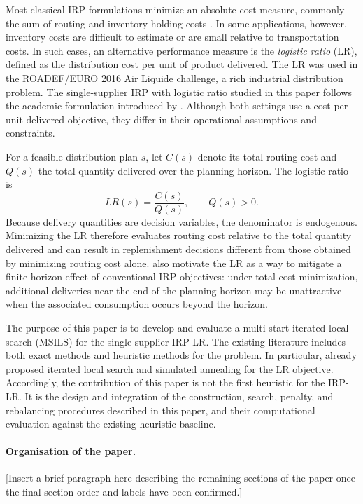 \documentclass{article}
\begin{document}
Most classical IRP formulations minimize an absolute cost measure, commonly
the sum of routing and inventory-holding costs
\citep{archetti2012hybrid,archetti2016inventory}. In some applications,
however, inventory costs are difficult to estimate or are small relative
to transportation costs. In such cases, an alternative performance measure
is the \emph{logistic ratio} (LR), defined as the distribution cost per
unit of product delivered. The LR was used in the ROADEF/EURO 2016
Air Liquide challenge, a rich industrial distribution problem. The
single-supplier IRP with logistic ratio studied in this paper follows the
academic formulation introduced by \cite{archetti2017logistic}. Although
both settings use a cost-per-unit-delivered objective, they differ in
their operational assumptions and constraints.

For a feasible distribution plan $s$, let $C(s)$ denote its total routing
cost and $Q(s)$ the total quantity delivered over the planning horizon.
The logistic ratio is
\begin{equation}
    LR(s)=\frac{C(s)}{Q(s)}, \qquad Q(s)>0.
    \label{eq:general_lr}
\end{equation}
Because delivery quantities are decision variables, the denominator is
endogenous. Minimizing the LR therefore evaluates routing cost relative to
the total quantity delivered and can result in replenishment decisions
different from those obtained by minimizing routing cost alone.
\cite{archetti2017logistic} also motivate the LR as a way to mitigate a
finite-horizon effect of conventional IRP objectives: under total-cost
minimization, additional deliveries near the end of the planning horizon
may be unattractive when the associated consumption occurs beyond the
horizon.

The purpose of this paper is to develop and evaluate a multi-start
iterated local search (MSILS) for the single-supplier IRP-LR. The existing
literature includes both exact methods and heuristic methods for the
problem. In particular, \cite{alvarez2018iterated} already proposed
iterated local search and simulated annealing for the LR objective.
Accordingly, the contribution of this paper is not the first heuristic for
the IRP-LR. It is the design and integration of the construction, search,
penalty, and rebalancing procedures described in this paper, and their
computational evaluation against the existing heuristic baseline.

\paragraph{Organisation of the paper.}
[Insert a brief paragraph here describing the remaining sections of the
paper once the final section order and labels have been confirmed.]
\end{document}
